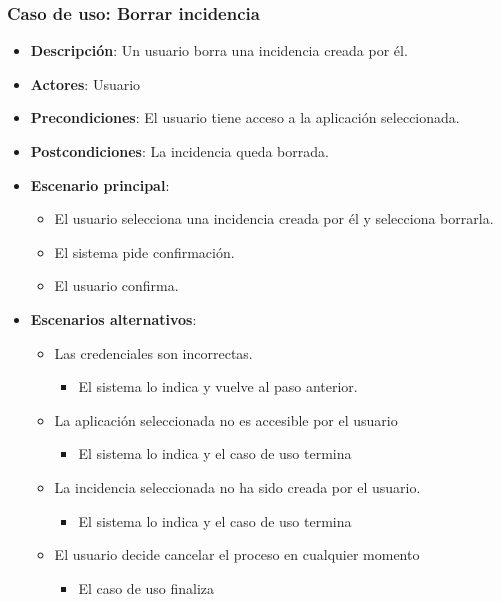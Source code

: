 \documentclass[12pt,a4paperpaper,]{report}
\providecommand{\tightlist}{%
  \setlength{\itemsep}{0pt}\setlength{\parskip}{0pt}}
\begin{document}
\subsubsection{Caso de uso: Borrar
incidencia}\label{caso-de-uso-borrar-incidencia}

\begin{itemize}
\tightlist
\item
  \textbf{Descripción}: Un usuario borra una incidencia creada por él.
\item
  \textbf{Actores}: Usuario
\item
  \textbf{Precondiciones}: El usuario tiene acceso a la aplicación
  seleccionada.
\item
  \textbf{Postcondiciones}: La incidencia queda borrada.
\item
  \textbf{Escenario principal}:

  \begin{itemize}
  \tightlist
  \item
    El usuario selecciona una incidencia creada por él y selecciona
    borrarla.
  \item
    El sistema pide confirmación.
  \item
    El usuario confirma.
  \end{itemize}
\item
  \textbf{Escenarios alternativos}:

  \begin{itemize}
  \tightlist
  \item
    Las credenciales son incorrectas.

    \begin{itemize}
    \tightlist
    \item
      El sistema lo indica y vuelve al paso anterior.
    \end{itemize}
  \item
    La aplicación seleccionada no es accesible por el usuario

    \begin{itemize}
    \tightlist
    \item
      El sistema lo indica y el caso de uso termina
    \end{itemize}
  \item
    La incidencia seleccionada no ha sido creada por el usuario.

    \begin{itemize}
    \tightlist
    \item
      El sistema lo indica y el caso de uso termina
    \end{itemize}
  \item
    El usuario decide cancelar el proceso en cualquier momento

    \begin{itemize}
    \tightlist
    \item
      El caso de uso finaliza
    \end{itemize}
  \end{itemize}
\end{itemize}
\end{document}
